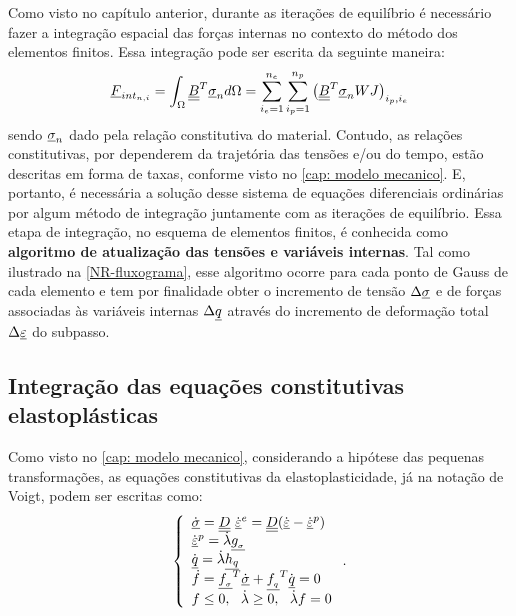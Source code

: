 Como visto no capítulo anterior, durante as iterações de equilíbrio é necessário fazer a integração espacial das forças internas no contexto do método dos elementos finitos. Essa integração pode ser escrita da seguinte maneira:
\begin{equation}
	\label{eq:Fint}
	\underline{F}_{int_{n,i}} = \int_{\Omega}\underline{\underline B}^T\underline \sigma_{n}d\Omega = \sum_{i_e=1}^{n_e}\sum_{i_p=1}^{n_p}\left( \underline{\underline B}^T\underline \sigma_{n}WJ\right)_{i_p,i_e}
\end{equation}
sendo $\underline \sigma_{n}$ dado pela relação constitutiva do material. Contudo, as relações constitutivas, por dependerem da trajetória das tensões e/ou do tempo, estão descritas em forma de taxas, conforme visto no \autoref{cap: modelo mecanico}. E, portanto, é necessária a solução desse sistema de equações diferenciais ordinárias por algum método de integração juntamente com as iterações de equilíbrio. Essa etapa de integração, no esquema de elementos finitos, é conhecida como \textbf{algoritmo de atualização das tensões e variáveis internas}. Tal como ilustrado na \autoref{NR-fluxograma}, esse algoritmo ocorre para cada ponto de Gauss de cada elemento e tem por finalidade obter o incremento de tensão $\Delta \underline \sigma$ e de forças associadas às variáveis internas $\Delta \underline q$ através do incremento de deformação total $\Delta \underline{\varepsilon}$ do subpasso.

\subsection{Integração das equações constitutivas elastoplásticas}

Como visto no \autoref{cap: modelo mecanico}, considerando a hipótese das pequenas transformações, as equações constitutivas da elastoplasticidade, já na notação de Voigt, podem ser escritas como:
\begin{equation}
	\label{eq:constitutiva_ep}
	\left\{
	\begin{array}{lcl}
		\dot {\underline \sigma} = \underline{\underline D}~\dot {\underline{\varepsilon}}^e = \underline{\underline D}(\dot {\underline{\varepsilon}} - \dot {\underline{\varepsilon}}^p) \\
		\dot {\underline{\varepsilon}}^p = \dot \lambda \underline{g_{_\sigma}} \\
		\dot {\underline q} = \dot \lambda \underline{h_q} \\
		\dot f = \underline{f_{_\sigma}}^T \dot {\underline \sigma} + \underline{f_{_q}}^T \dot {\underline q} = 0 \\
		f \leq 0,~~\dot \lambda \geq 0,~~\dot \lambda f = 0	
	\end{array}
	\right..
\end{equation}

